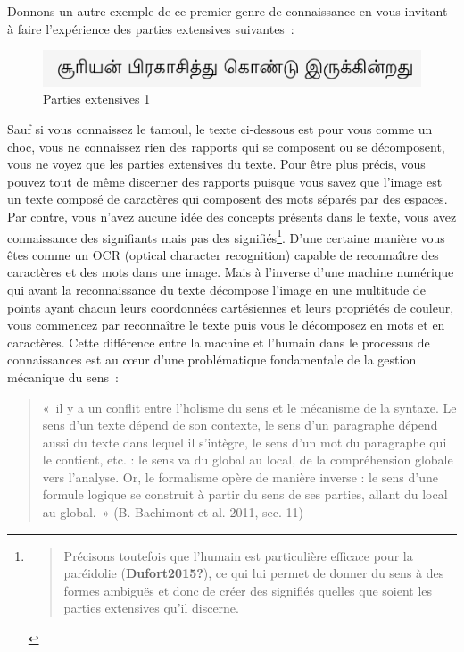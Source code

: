 \documentclass[
  letterpaper,
  DIV=11,
  numbers=noendperiod]{scrreprt}
\begin{document}
Donnons un autre exemple de ce premier genre de connaissance en vous
invitant à faire l'expérience des parties extensives suivantes~:

\begin{figure}

{\centering \includegraphics{media/10000001000001EB0000002F6C14D0CF44FAB1C7.png}

}

\caption{\label{fig-partExt1}Parties extensives 1}

\end{figure}

Sauf si vous connaissez le tamoul, le texte ci-dessous est pour vous
comme un choc, vous ne connaissez rien des rapports qui se composent ou
se décomposent, vous ne voyez que les parties extensives du texte. Pour
être plus précis, vous pouvez tout de même discerner des rapports
puisque vous savez que l'image est un texte composé de caractères qui
composent des mots séparés par des espaces. Par contre, vous n'avez
aucune idée des concepts présents dans le texte, vous avez connaissance
des signifiants mais pas des signifiés\footnote{\begin{quote}
  Précisons toutefois que l'humain est particulière efficace pour la
  paréidolie (\textbf{Dufort2015?}), ce qui lui permet de donner du sens
  à des formes ambiguës et donc de créer des signifiés quelles que
  soient les parties extensives qu'il discerne.
  \end{quote}}. D'une certaine manière vous êtes comme un OCR (optical
character recognition) capable de reconnaître des caractères et des mots
dans une image. Mais à l'inverse d'une machine numérique qui avant la
reconnaissance du texte décompose l'image en une multitude de points
ayant chacun leurs coordonnées cartésiennes et leurs propriétés de
couleur, vous commencez par reconnaître le texte puis vous le décomposez
en mots et en caractères. Cette différence entre la machine et l'humain
dans le processus de connaissances est au cœur d'une problématique
fondamentale de la gestion mécanique du sens~:

\begin{quote}
«~il y a un conflit entre l'holisme du sens et le mécanisme de la
syntaxe. Le sens d'un texte dépend de son contexte, le sens d'un
paragraphe dépend aussi du texte dans lequel il s'intègre, le sens d'un
mot du paragraphe qui le contient, etc. : le sens va du global au local,
de la compréhension globale vers l'analyse. Or, le formalisme opère de
manière inverse : le sens d'une formule logique se construit à partir du
sens de ses parties, allant du local au global.~» (B. Bachimont et al.
2011, sec. 11)
\end{quote}
\end{document}
